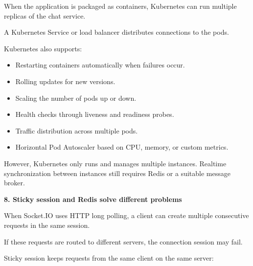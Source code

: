 When the application is packaged as containers, Kubernetes can run
multiple replicas of the chat service.

\begin{Shaded}
\begin{Highlighting}[]
\end{Highlighting}
\end{Shaded}

A Kubernetes Service or load balancer distributes connections to the
pods.

Kubernetes also supports:

\begin{itemize}
\tightlist
\item
  Restarting containers automatically when failures occur.
\item
  Rolling updates for new versions.
\item
  Scaling the number of pods up or down.
\item
  Health checks through liveness and readiness probes.
\item
  Traffic distribution across multiple pods.
\item
  Horizontal Pod Autoscaler based on CPU, memory, or custom metrics.
\end{itemize}

However, Kubernetes only runs and manages multiple instances. Realtime
synchronization between instances still requires Redis or a suitable
message broker.

\vspace{0.5em}\noindent\textbf{8. Sticky session and Redis solve different
problems}\par

When Socket.IO uses HTTP long polling, a client can create multiple
consecutive requests in the same session.

If these requests are routed to different servers, the connection
session may fail.

Sticky session keeps requests from the same client on the same server:

\begin{Shaded}
\begin{Highlighting}[]
\end{Highlighting}
\end{Shaded}

